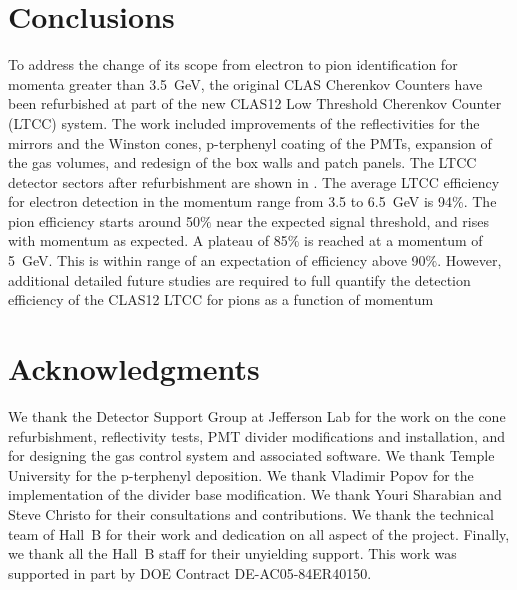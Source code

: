 \section{Conclusions}

To address the change of its scope from electron to pion identification for momenta greater than 3.5~GeV,
the original CLAS Cherenkov Counters have been refurbished at part of the new CLAS12 Low Threshold
Cherenkov Counter (LTCC) system. The work included improvements of the reflectivities for the mirrors and
the Winston cones, p-terphenyl coating of the PMTs, expansion of the gas volumes, and redesign of the box
walls and patch panels. The LTCC detector sectors after refurbishment are shown in .
The average LTCC efficiency for electron detection in the momentum range from 3.5 to 6.5~GeV is 94$\%$.
The pion efficiency starts around 50$\%$ near the expected signal threshold, and rises with momentum as
expected. A plateau of 85$\%$ is reached at a momentum of 5~GeV. This is within range of an expectation of
efficiency above 90$\%$. However, additional detailed future studies are required to full quantify the
detection efficiency of the CLAS12 LTCC for pions as a function of momentum

\section{Acknowledgments}

We thank the Detector Support Group at Jefferson Lab for the work on the cone refurbishment, reflectivity tests,
PMT divider modifications and installation, and for designing the gas control system and associated software.
We thank Temple University for the p-terphenyl deposition. We thank Vladimir Popov for the implementation
of the divider base modification. We thank Youri Sharabian and Steve Christo for their consultations and contributions.
We thank the technical team of Hall~B for their work and dedication on all aspect of the project.
Finally, we thank all the Hall~B staff for their unyielding support.
This work was supported in part by DOE Contract DE-AC05-84ER40150.
